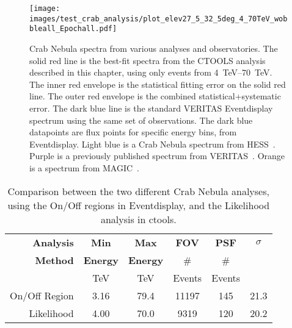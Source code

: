     
    
  \begin{figure}[h]
    \centering
    \texttt{[image: images/test\_crab\_analysis/plot\_elev27\_5\_32\_5deg\_4\_70TeV\_wobbleall\_Epochall.pdf]}
    \caption[Crab Test Spectrum]
    {
      Crab Nebula spectra from various analyses and observatories.
      The solid red line is the best-fit spectra from the CTOOLS analysis described in this chapter, using only events from \SIrange{4}{70}{TeV}.
      The inner red envelope is the statistical fitting error on the solid red line.
      The outer red envelope is the combined statistical+systematic error.
      The dark blue line is the standard VERITAS Eventdisplay spectrum using the same set of observations.
      The dark blue datapoints are flux points for specific energy bins, from Eventdisplay.
      Light blue is a Crab Nebula spectrum from HESS~\cite{hess2006crab}.
      Purple is a previously published spectrum from VERITAS~\cite{veritas2015crab}.
      Orange is a spectrum from MAGIC~\cite{magic2015crab}.
    }
    \label{fig:crab_test_spectra}
  \end{figure}
    
  \begin{table}
    \centering
    \begin{tabular}{|r|c|c|c|c|c|}
      \hline
      \textbf{Analysis} & \textbf{Min}    & \textbf{Max}    & \textbf{FOV} & \textbf{PSF} & \textbf{$\sigma$} \\
      \textbf{Method}   & \textbf{Energy} & \textbf{Energy} &  \#          & \#           &                   \\
                        & TeV             & TeV             &  Events      & Events       &                   \\
      \hline 
      On/Off Region & 3.16 & 79.4 & 11197 & 145 & 21.3 \\
      Likelihood    & 4.00 & 70.0 & 9319  & 120 & 20.2 \\
      \hline 
    \end{tabular}
    \caption[Analysis Comparison]{
      Comparison between the two different Crab Nebula analyses, using the On/Off regions in Eventdisplay, and the Likelihood analysis in ctools.
    }
    \label{tab:crab_statistics}
  \end{table}

